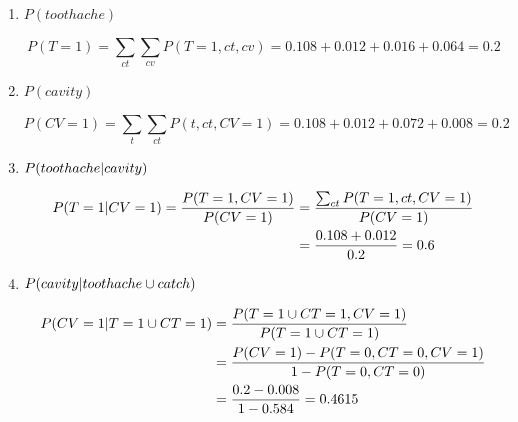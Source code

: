 \documentclass[11pt, a4paper]{article}
\begin{document}
\begin{enumerate}
    \item $P(toothache)$
    
    \begin{solution}
        \begin{equation*}
            P(T = 1) = \sum_{ct} \sum_{cv} P(T = 1, ct, cv) = 0.108 + 0.012 + 0.016 + 0.064 = 0.2
        \end{equation*}
    \end{solution}
    
    \item $P(cavity)$
    
    \begin{solution}
        \begin{equation*}
            P(CV = 1) = \sum_{t} \sum_{ct} P(t, ct, CV = 1) = 0.108 + 0.012 + 0.072 + 0.008 = 0.2
        \end{equation*}
    \end{solution}
    
    \item $P(toothache \vert cavity)$
    
    \begin{solution}
        \begin{align*}
            P(T = 1 \vert CV = 1) = \frac{P(T = 1, CV = 1)}{P(CV = 1)} & = \frac{\sum_{ct} P(T = 1, ct, CV = 1)}{P(CV = 1)} \\
            & = \frac{0.108 + 0.012}{0.2} = 0.6
        \end{align*}
    \end{solution}
    
    \item $P(cavity \vert toothache \cup catch)$
    
    \begin{solution}
        \begin{align*}
            P(CV = 1 \vert T = 1 \cup CT = 1) & = \frac{P(T = 1 \cup CT = 1, CV = 1)}{P(T = 1 \cup CT = 1)} \\
            & = \frac{P(CV = 1) - P(T = 0, CT = 0, CV = 1)}{1 - P(T = 0, CT = 0)} \\
            & = \frac{0.2 - 0.008}{1 - 0.584} = \num{0.4615}
        \end{align*}
    \end{solution}
    
\end{enumerate}

\newpage
\end{document}

